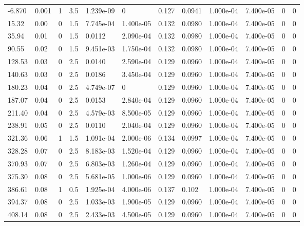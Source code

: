 \documentclass[preview]{standalone}
\begin{document}
{{\begin{tabular}{L{1.2cm}C{1.2cm} C{0.3cm}C{0.5cm} C{1.4cm}C{1.4cm} C{1.4cm}C{1.4cm} C{1.6cm}C{1.6cm} C{1.6cm}C{1.6cm}}
  -6.870  &  0.001  & 1     & 3.5 &  1.239e-09  & 0  &  0.127&   0.0941& 1.000e-04 & 7.400e-05   &  0 & 0  \\ 
  15.32  &  0.00  & 0     & 1.5 &  7.745e-04  & 1.400e-05  &  0.132&   0.0980& 1.000e-04 & 7.400e-05   &  0 & 0  \\ 
  35.94  &  0.01  & 0     & 1.5 &  0.0112  & 2.090e-04  &  0.132&   0.0980& 1.000e-04 & 7.400e-05   &  0 & 0  \\ 
  90.55  &  0.02  & 0     & 1.5 &  9.451e-03  & 1.750e-04  &  0.132&   0.0980& 1.000e-04 & 7.400e-05   &  0 & 0  \\ 
  128.53  &  0.03  & 0     & 2.5 &  0.0140  & 2.590e-04  &  0.129&   0.0960& 1.000e-04 & 7.400e-05   &  0 & 0  \\ 
  140.63  &  0.03  & 0     & 2.5 &  0.0186  & 3.450e-04  &  0.129&   0.0960& 1.000e-04 & 7.400e-05   &  0 & 0  \\ 
  180.23  &  0.04  & 0     & 2.5 &  4.749e-07  & 0  &  0.129&   0.0960& 1.000e-04 & 7.400e-05   &  0 & 0  \\ 
  187.07  &  0.04  & 0     & 2.5 &  0.0153  & 2.840e-04  &  0.129&   0.0960& 1.000e-04 & 7.400e-05   &  0 & 0  \\ 
  211.40  &  0.04  & 0     & 2.5 &  4.579e-03  & 8.500e-05  &  0.129&   0.0960& 1.000e-04 & 7.400e-05   &  0 & 0  \\ 
  238.91  &  0.05  & 0     & 2.5 &  0.0110  & 2.040e-04  &  0.129&   0.0960& 1.000e-04 & 7.400e-05   &  0 & 0  \\ 
  321.36  &  0.06  & 1     & 1.5 &  1.091e-04  & 2.000e-06  &  0.134&   0.0997& 1.000e-04 & 7.400e-05   &  0 & 0  \\ 
  328.28  &  0.07  & 0     & 2.5 &  8.183e-03  & 1.520e-04  &  0.129&   0.0960& 1.000e-04 & 7.400e-05   &  0 & 0  \\ 
  370.93  &  0.07  & 0     & 2.5 &  6.803e-03  & 1.260e-04  &  0.129&   0.0960& 1.000e-04 & 7.400e-05   &  0 & 0  \\ 
  375.30  &  0.08  & 0     & 2.5 &  5.681e-05  & 1.000e-06  &  0.129&   0.0960& 1.000e-04 & 7.400e-05   &  0 & 0  \\ 
  386.61  &  0.08  & 1     & 0.5 &  1.925e-04  & 4.000e-06  &  0.137&   0.102& 1.000e-04 & 7.400e-05   &  0 & 0  \\ 
  394.37  &  0.08  & 0     & 2.5 &  1.033e-03  & 1.900e-05  &  0.129&   0.0960& 1.000e-04 & 7.400e-05   &  0 & 0  \\ 
  408.14  &  0.08  & 0     & 2.5 &  2.433e-03  & 4.500e-05  &  0.129&   0.0960& 1.000e-04 & 7.400e-05   &  0 & 0  \\ 

\end{tabular}}}
\end{document}
